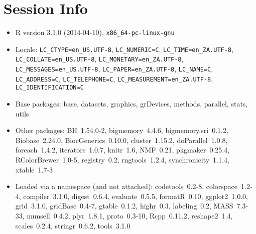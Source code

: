\documentclass[a4paper]{article}\usepackage[]{graphicx}\usepackage[]{color}
\begin{document}
\section{Session Info}
\begin{itemize}\raggedright
  \item R version 3.1.0 (2014-04-10), \verb|x86_64-pc-linux-gnu|
  \item Locale: \verb|LC_CTYPE=en_US.UTF-8|, \verb|LC_NUMERIC=C|, \verb|LC_TIME=en_ZA.UTF-8|, \verb|LC_COLLATE=en_US.UTF-8|, \verb|LC_MONETARY=en_ZA.UTF-8|, \verb|LC_MESSAGES=en_US.UTF-8|, \verb|LC_PAPER=en_ZA.UTF-8|, \verb|LC_NAME=C|, \verb|LC_ADDRESS=C|, \verb|LC_TELEPHONE=C|, \verb|LC_MEASUREMENT=en_ZA.UTF-8|, \verb|LC_IDENTIFICATION=C|
  \item Base packages: base, datasets, graphics, grDevices,
    methods, parallel, stats, utils
  \item Other packages: BH~1.54.0-2, bigmemory~4.4.6,
    bigmemory.sri~0.1.2, Biobase~2.24.0, BiocGenerics~0.10.0,
    cluster~1.15.2, doParallel~1.0.8, foreach~1.4.2,
    iterators~1.0.7, knitr~1.6, NMF~0.21, pkgmaker~0.25.4,
    RColorBrewer~1.0-5, registry~0.2, rngtools~1.2.4,
    synchronicity~1.1.4, xtable~1.7-3
  \item Loaded via a namespace (and not attached):
    codetools~0.2-8, colorspace~1.2-4, compiler~3.1.0,
    digest~0.6.4, evaluate~0.5.5, formatR~0.10, ggplot2~1.0.0,
    grid~3.1.0, gridBase~0.4-7, gtable~0.1.2, highr~0.3,
    labeling~0.2, MASS~7.3-33, munsell~0.4.2, plyr~1.8.1,
    proto~0.3-10, Rcpp~0.11.2, reshape2~1.4, scales~0.2.4,
    stringr~0.6.2, tools~3.1.0
\end{itemize}


\printbibliography[heading=bibintoc]
\end{document}
